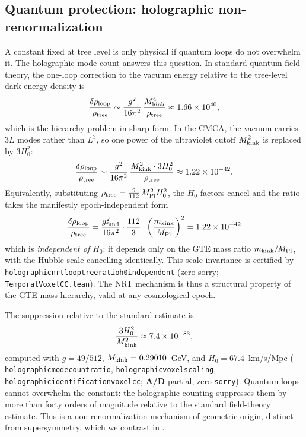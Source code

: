 \documentclass[11pt]{article}
\theoremstyle{remark}
\newcommand{\lean}[1]{%
  \penalty-100
  \begingroup\def\_{\textunderscore\allowbreak}\texttt{#1}\endgroup}
\newcommand{\Mkink}{M_{\rm kink}}
\newcommand{\Hnought}{H_0}
\newcommand{\CMCA}{\text{CMCA}}
\newcommand{\CatAD}{\textbf{A/D}}
\begin{document}
\subsection{Quantum protection: holographic non-renormalization}
\label{sec:cc-nrt}

A constant fixed at tree level is only physical if quantum loops do not overwhelm
it. The holographic mode count answers this question. In standard quantum field
theory, the one-loop correction to the vacuum energy relative to the tree-level
dark-energy density is
\begin{equation}
  \frac{\delta\rho_{\rm loop}}{\rho_{\rm tree}}
  \sim \frac{g^2}{16\pi^2}\,\frac{\Mkink^4}{\rho_{\rm tree}}
  \approx 1.66\times10^{40},
\end{equation}
which is the hierarchy problem in sharp form. In the $\CMCA$, the vacuum carries
$3L$ modes rather than $L^3$, so one power of the ultraviolet cutoff $\Mkink^2$ is
replaced by $3\Hnought^2$:
\begin{equation}
  \frac{\delta\rho_{\rm loop}}{\rho_{\rm tree}}
  \sim \frac{g^2}{16\pi^2}\,\frac{\Mkink^2\cdot 3\Hnought^2}{\rho_{\rm tree}}
  \approx 1.22\times10^{-42}.
\end{equation}
Equivalently, substituting $\rho_{\rm tree} = \tfrac{9}{112}\,M_{\rm Pl}^2 H_0^2$,
the $H_0$ factors cancel and the ratio takes the manifestly epoch-independent form
\begin{equation}
  \frac{\delta\rho_{\rm loop}}{\rho_{\rm tree}}
  = \frac{g_{\rm fund}^2}{16\pi^2}\cdot\frac{112}{3}\cdot
  \left(\frac{m_{\rm kink}}{M_{\rm Pl}}\right)^2 = 1.22\times10^{-42}
  \label{eq:nrt-ratio}
\end{equation}
which is \emph{independent of $H_0$}: it depends only on the GTE mass ratio
$m_{\rm kink}/M_{\rm Pl}$, with the Hubble scale cancelling identically.
This scale-invariance is certified by
\lean{holographic\_nrt\_loop\_tree\_ratio\_h0\_independent} (zero sorry;
\texttt{TemporalVoxelCC.lean}). The NRT mechanism is thus a structural property of
the GTE mass hierarchy, valid at any cosmological epoch.

The suppression relative to the standard estimate is
\begin{equation}
  \frac{3\Hnought^2}{\Mkink^2} \approx 7.4\times10^{-83},
\end{equation}
computed with $g = 49/512$, $\Mkink = 0.29010$~GeV, and $\Hnought = 67.4$~km/s/Mpc
(\lean{holographic\_mode\_count\_ratio}, \lean{holographic\_voxel\_scaling},
\lean{holographic\_identification\_voxel\_cc}; \CatAD-partial, zero \texttt{sorry}).
Quantum loops cannot overwhelm the constant: the holographic counting suppresses
them by more than forty orders of magnitude relative to the standard field-theory
estimate. This is a non-renormalization mechanism of geometric origin, distinct
from supersymmetry, which we contrast in .
\end{document}
